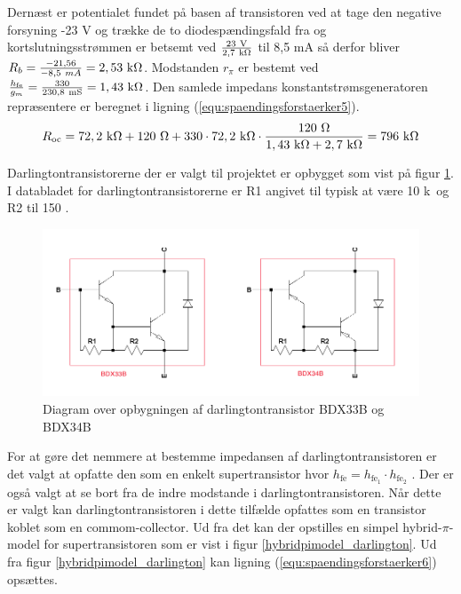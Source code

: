 Dernæst er potentialet fundet på basen af transistoren ved at tage den negative forsyning -23 V og trække de to diodespændingsfald fra og kortslutningsstrømmen er betsemt ved $\frac{23~\mathrm{V}}{2,7~\mathrm{k}\ohm}$ til 8,5 mA så derfor bliver $R_b = \frac{-21,56}{-8,5~mA} = 2,53~\mathrm{k}\ohm$. Modstanden $r_{\pi}$ er bestemt ved $\frac{h_{\mathrm{fe}}}{g_m} = \frac{330}{230,8~\mathrm{mS}} = 1,43~\mathrm{k}\ohm$. Den samlede impedans konstantstrømsgeneratoren repræsentere er beregnet i ligning (\ref{equ:spaendingsforstaerker5}). 
\begin{equation}
\label{equ:spaendingsforstaerker5}
R_{\mathrm{oc}} = 72,2~\mathrm{k}\ohm + 120~\ohm + 330 \cdot 72,2~\mathrm{k}\ohm \cdot \frac{120~\ohm}{1,43~\mathrm{k}\ohm + 2,7~\mathrm{k}\ohm} = 796~\mathrm{k}\ohm
\end{equation}


Darlingtontransistorerne der er valgt til projektet er opbygget som vist på figur \ref{darlington_diagram}. I databladet for darlingtontransistorerne \cite{bdx33-34-datablad} er R1 angivet til typisk at være 10 k\ohm~og R2 til 150 \ohm.

\begin{figure}[h]
\centering
\includegraphics[scale = 0.4]{teknisk/effektforstaerker/darlingtontransistor_opbygning.png}
\caption{Diagram over opbygningen af darlingtontransistor BDX33B og BDX34B}
\label{darlington_diagram}
\end{figure}

For at gøre det nemmere at bestemme impedansen af darlingtontransistoren er det valgt at opfatte den som en enkelt supertransistor hvor $h_{\mathrm{fe}}= h_{\mathrm{fe}_1} \cdot h_{\mathrm{fe}_2}$ \cite{sedra-smith}. %
Der er også valgt at se bort fra de indre modstande i darlingtontransistoren. Når dette er valgt kan darlingtontransistoren i dette tilfælde opfattes som en transistor koblet som en commom-collector. Ud fra det kan der opstilles en simpel hybrid-$\pi$-model for supertransistoren som er vist i figur \ref{hybridpimodel_darlington}. Ud fra figur \ref{hybridpimodel_darlington} kan ligning (\ref{equ:spaendingsforstaerker6}) opsættes.

